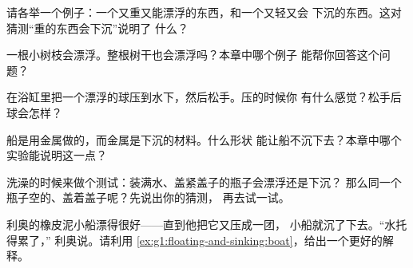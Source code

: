 \begin{exercise}[$\star$]\label{exo:g1:floating-and-sinking:4}
请各举一个例子：一个又重又能漂浮的东西，和一个又轻又会
下沉的东西。这对猜测“重的东西会下沉”说明了
什么？
\end{exercise}

\begin{exercise}[$\star$]\label{exo:g1:floating-and-sinking:5}
一根小树枝会漂浮。整根树干也会漂浮吗？本章中哪个例子
能帮你回答这个问题？
\end{exercise}

\begin{exercise}[$\star$]\label{exo:g1:floating-and-sinking:6}
在浴缸里把一个漂浮的球压到水下，然后松手。压的时候你
有什么感觉？松手后球会怎样？
\end{exercise}

\begin{exercise}[$\star$]\label{exo:g1:floating-and-sinking:7}
船是用金属做的，而金属是下沉的材料。什么形状
能让船不沉下去？本章中哪个实验能说明这一点？
\end{exercise}

\begin{exercise}[$\star$]\label{exo:g1:floating-and-sinking:8}
洗澡的时候来做个测试：装满水、盖紧盖子的瓶子会漂浮还是下沉？
那么同一个瓶子空的、盖着盖子呢？先说出你的猜测，
再去试一试。
\end{exercise}

\begin{exercise}[$\star\star$]\label{exo:g1:floating-and-sinking:9}
利奥的橡皮泥小船漂得很好——直到他把它又压成一团，
小船就沉了下去。“水托得累了，”
利奥说。请利用
\cref{ex:g1:floating-and-sinking:boat}，给出一个更好的解释。
\end{exercise}

